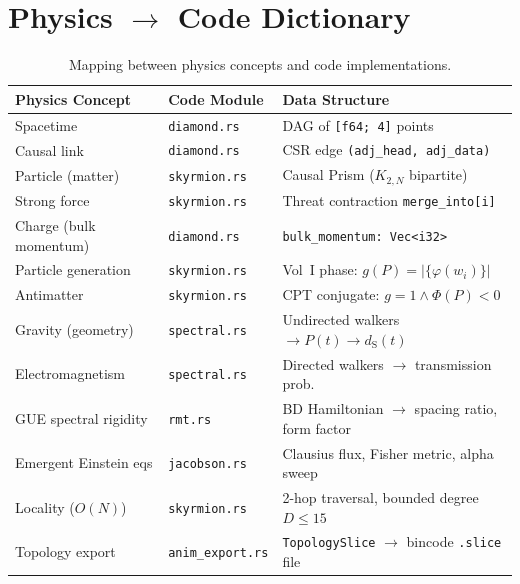 \documentclass[11pt, a4paper, openany]{book}
\newcommand{\dS}{d_{\mathrm{S}}}
\newcommand{\code}[1]{\texttt{#1}}
\begin{document}
\section{Physics $\to$ Code Dictionary}

\begin{table}[H]
\centering
\begin{tabular}{@{} l l l @{}}
\toprule
\textbf{Physics Concept} & \textbf{Code Module} & \textbf{Data Structure} \\
\midrule
Spacetime              & \code{diamond.rs}  & DAG of \code{[f64; 4]} points \\
Causal link            & \code{diamond.rs}  & CSR edge \code{(adj\_head, adj\_data)} \\
Particle (matter)      & \code{skyrmion.rs} & Causal Prism ($K_{2,N}$ bipartite) \\
Strong force           & \code{skyrmion.rs} & Threat contraction \code{merge\_into[i]} \\
Charge (bulk momentum) & \code{diamond.rs}  & \code{bulk\_momentum: Vec<i32>} \\
Particle generation    & \code{skyrmion.rs} & Vol~I phase: $g(P) = |\{\varphi(w_i)\}|$ \\
Antimatter             & \code{skyrmion.rs} & CPT conjugate: $g{=}1 \wedge \Phi(P){<}0$ \\
Gravity (geometry)     & \code{spectral.rs} & Undirected walkers $\to P(t) \to \dS(t)$ \\
Electromagnetism       & \code{spectral.rs} & Directed walkers $\to$ transmission prob. \\
GUE spectral rigidity  & \code{rmt.rs}      & BD Hamiltonian $\to$ spacing ratio, form factor \\
Emergent Einstein eqs  & \code{jacobson.rs} & Clausius flux, Fisher metric, alpha sweep \\
Locality ($O(N)$)      & \code{skyrmion.rs} & 2-hop traversal, bounded degree $D \le 15$ \\
Topology export        & \code{anim\_export.rs} & \code{TopologySlice} $\to$ bincode \code{.slice} file \\
\bottomrule
\end{tabular}
\caption{Mapping between physics concepts and code implementations.}
\label{tab:dictionary}
\end{table}


\end{document}
